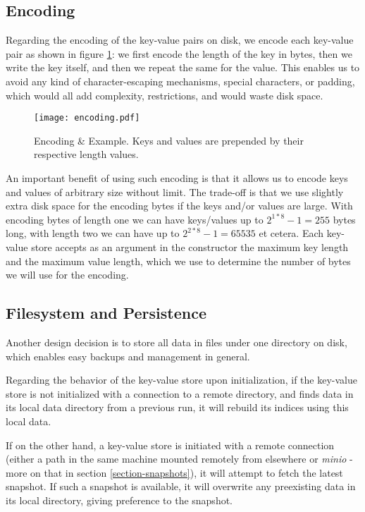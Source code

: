\subsection{Encoding}

Regarding the encoding of the key-value pairs on disk, we encode each key-value pair as shown in figure \ref{fig:encoding}: we first encode the length of the key in bytes, then we write the key itself, and then we repeat the same for the value. This enables us to avoid any kind of character-escaping mechanisms, special characters, or padding, which would all add complexity, restrictions, and would waste disk space.

\vspace{20px}
\begin{figure}[h]
    \centering
    \texttt{[image: encoding.pdf]}
    \caption{Encoding \& Example. Keys and values are prepended by their respective length values.}
    \label{fig:encoding}
\end{figure}
\vspace{20px}

An important benefit of using such encoding is that it allows us to encode keys and values of arbitrary size without limit. The trade-off is that we use slightly extra disk space for the encoding bytes if the keys and/or values are large. With encoding bytes of length one we can have keys/values up to $2^{1*8}-1=255$ bytes long, with length two we can have up to $2^{2*8}-1=65535$ et cetera. Each key-value store accepts as an argument in the constructor the maximum key length and the maximum value length, which we use to determine the number of bytes we will use for the encoding.

\subsection{Filesystem and Persistence}

Another design decision is to store all data in files under one directory on disk, which enables easy backups and management in general.

Regarding the behavior of the key-value store upon initialization, if the key-value store is not initialized with a connection to a remote directory, and finds data in its local data directory from a previous run, it will rebuild its indices using this local data.

If on the other hand, a key-value store is initiated with a remote connection (either a path in the same machine mounted remotely from elsewhere or \textit{minio} - more on that in section \ref{section-snapshots}), it will attempt to fetch the latest snapshot. If such a snapshot is available, it will overwrite any preexisting data in its local directory, giving preference to the snapshot.

